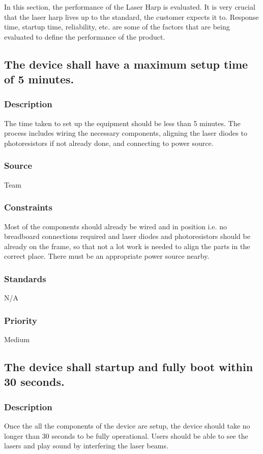 In this section, the performance of the Laser Harp is evaluated. It is very crucial that the laser harp lives up to the standard, the customer expects it to. Response time, startup time, reliability, etc. are some of the factors that are being evaluated to define the performance of the product.

\subsection{The device shall have a maximum setup time of 5 minutes.}
\subsubsection{Description}
The time taken to set up the equipment should be less than 5 minutes. The process includes wiring the necessary components, aligning the laser diodes to photoresistors if not already done, and connecting to power source.
\subsubsection{Source}
Team
\subsubsection{Constraints}
Most of the components should already be wired and in position i.e. no breadboard connections required and laser diodes and photoresistors should be already on the frame, so that not a lot work is needed to align the parts in the correct place. There must be an appropriate power source nearby.
\subsubsection{Standards}
N/A
\subsubsection{Priority}
Medium

\subsection{The device shall startup and fully boot within 30 seconds.}
\subsubsection{Description}
Once the all the components of the device are setup, the device should take no longer than 30 seconds to be fully operational. Users should be able to see the lasers and play sound by interfering the laser beams.
